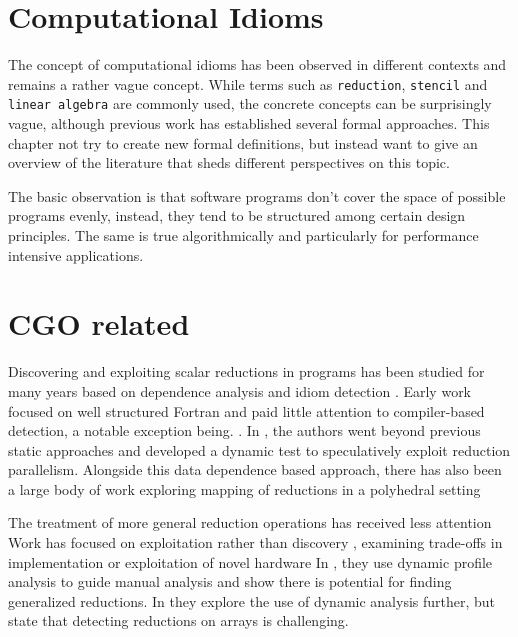 \section{Computational Idioms}

    The concept of computational idioms has been observed in different contexts
    and remains a rather vague concept.
    While terms such as \texttt{reduction}, \texttt{stencil} and
    \texttt{linear algebra} are commonly used, the concrete concepts can be
    surprisingly vague, although previous work has established several formal
    approaches.
    This chapter not try to create new formal definitions, but instead want to
    give an overview of the literature that sheds different perspectives on this
    topic.

    The basic observation is that software programs don't cover the space of
    possible programs evenly, instead, they tend to be structured among certain
    design principles.
    The same is true algorithmically and particularly for performance intensive
    applications.


\section{CGO related}
Discovering and exploiting scalar reductions in programs has been
studied for many years based on dependence analysis and idiom detection
 \cite{pottenger1995idiom,suganuma1996detection,fisher1994parallelizing}.
Early work focused on well structured Fortran and
paid little attention to compiler-based detection, a notable exception being. 
\cite{suganuma1996detection}. 
In \cite{rauchwerger1999lrpd}, the authors went beyond previous static
 approaches and developed  a dynamic test to speculatively exploit
 reduction parallelism.
Alongside this data dependence based approach, there has also been a
 large body of work exploring mapping of reductions in a
 polyhedral setting \cite{redon1994scheduling, jouvelot1989unified}

 The treatment of
more general reduction operations has received  less attention
Work has focused on exploitation rather than discovery
\cite{gutierrez2003optimization,gutierrez2008analytical, Gutierrez:2000}, examining trade-offs in implementation \cite{yu2006adaptive}
 or exploitation of novel hardware \cite{ravi2010compiler,Huo2011HiPC}
In \cite{das2010experiences}, they use dynamic profile analysis to
guide manual analysis and show there is potential for finding
generalized reductions. In \cite{kim2012dynamic} they explore the use
of dynamic analysis further, but state that detecting reductions on arrays is
challenging.



